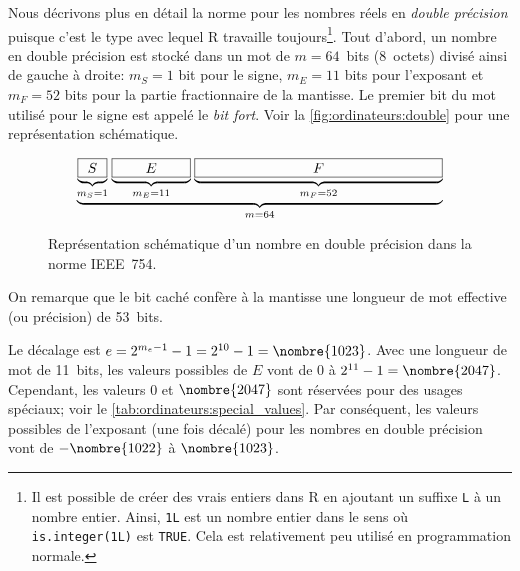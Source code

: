 \documentclass[letterpaper,11pt]{memoir}
\theoremstyle{plain}
\theoremstyle{definition}
\theoremstyle{remark}
\newcommand{\code}[1]{\texttt{#1}}
\begin{document}
Nous décrivons plus en détail la norme pour les nombres réels en
\emph{double précision} puisque c'est le type avec lequel R travaille
toujours\footnote{%
  \label{pg:arithmetique:entiers} Il est possible de créer des vrais
  entiers dans R en ajoutant un suffixe \code{L} à un nombre entier.
  Ainsi, \code{1L} est un nombre entier dans le sens où
  \code{is.integer(1L)} est \code{TRUE}. Cela est relativement peu
  utilisé en programmation normale.}. %
Tout d'abord, un nombre en double précision est stocké dans un mot de
$m = 64$~bits (8~octets) divisé ainsi de gauche à droite: $m_S = 1$ bit
pour le signe, $m_E = 11$ bits pour l'exposant et $m_F = 52$ bits pour
la partie fractionnaire de la mantisse. Le premier bit du mot utilisé
pour le signe est appelé le \emph{bit fort}. Voir la
\autoref{fig:ordinateurs:double} pour une représentation
schématique.

\begin{figure}
  \centering
  \begin{equation*}
    \underbrace{
      \underbrace{\fbox{\hspace{0.5pt} $S$ \hspace{0.5pt}}}_{m_S = 1}
      \hspace{1pt}
      \underbrace{\fbox{\hspace{17.5pt} $E$ \hspace{17.5pt}}}_{m_E = 11}
      \hspace{1pt}
      \underbrace{\fbox{\hspace{78pt} $F$ \hspace{78pt}}}_{m_F = 52}%
    }_{m = 64}
  \end{equation*}
  \caption{Représentation schématique d'un nombre en double précision
    dans la norme IEEE~754.}
  \label{fig:ordinateurs:double}
\end{figure}

On remarque que le bit caché confère à la mantisse une longueur de mot
effective (ou précision) de 53~bits.

Le décalage est $e = 2^{m_e - 1} - 1 = 2^{10} - 1 = \nombre{1023}$.
Avec une longueur de mot de 11~bits, les valeurs possibles de $E$ vont
de $0$ à $2^{11} - 1 = \nombre{2047}$. Cependant, les valeurs $0$ et
$\nombre{2047}$ sont réservées pour des usages spéciaux; voir le
\autoref{tab:ordinateurs:special_values}. Par conséquent, les
valeurs possibles de l'exposant (une fois décalé) pour les nombres en
double précision vont de $-\nombre{1022}$ à $\nombre{1023}$.
\end{document}
